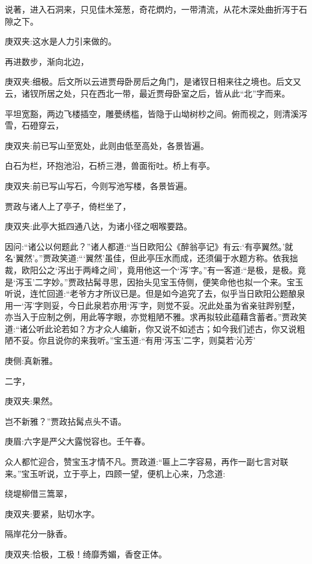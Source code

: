 \begin{parag}
    说著，进入石洞来，只见佳木笼葱，奇花熌灼，一带清流，从花木深处曲折泻于石隙之下。 \begin{note}庚双夹:这水是人力引来做的。\end{note} 再进数步，渐向北边， \begin{note}庚双夹:细极。后文所以云进贾母卧房后之角门，是诸钗日相来往之境也。后文又云，诸钗所居之处，只在西北一带，最近贾母卧室之后，皆从此“北”字而来。\end{note} 平坦宽豁，两边飞楼插空，雕甍绣槛，皆隐于山坳树杪之间。俯而视之，则清溪泻雪，石磴穿云， \begin{note}庚双夹:前已写山至宽处，此则由低至高处，各景皆遍。\end{note} 白石为栏，环抱池沿，石桥三港，兽面衔吐。桥上有亭。 \begin{note}庚双夹:前已写山写石，今则写池写楼，各景皆遍。\end{note} 贾政与诸人上了亭子，倚栏坐了， \begin{note}庚双夹:此亭大抵四通八达，为诸小径之咽喉要路。\end{note} 因问:“诸公以何题此？”诸人都道:“当日欧阳公《醉翁亭记》有云:‘有亭翼然。’就名‘翼然’。”贾政笑道:“‘翼然’虽佳，但此亭压水而成，还须偏于水题方称。依我拙裁，欧阳公之‘泻出于两峰之间’，竟用他这一个‘泻’字。”有一客道:“是极，是极。竟是‘泻玉’二字妙。”贾政拈髯寻思，因抬头见宝玉侍侧，便笑命他也拟一个来。宝玉听说，连忙回道:“老爷方才所议已是。但是如今追究了去，似乎当日欧阳公题酿泉用一‘泻’字则妥，今日此泉若亦用‘泻’字，则觉不妥。况此处虽为省亲驻跸别墅，亦当入于应制之例，用此等字眼，亦觉粗陋不雅。求再拟较此蕴藉含蓄者。”贾政笑道:“诸公听此论若如？方才众人编新，你又说不如述古；如今我们述古，你又说粗陋不妥。你且说你的来我听。”宝玉道:“有用‘泻玉’二字，则莫若‘沁芳’ \begin{note}庚侧:真新雅。\end{note} 二字， \begin{note}庚双夹:果然。\end{note} 岂不新雅？”贾政拈髯点头不语。 \begin{note}庚眉:六字是严父大露悦容也。壬午春。\end{note} 众人都忙迎合，赞宝玉才情不凡。贾政道:“匾上二字容易，再作一副七言对联来。”宝玉听说，立于亭上，四顾一望，便机上心来，乃念道:
\end{parag}


\begin{poem}
    \begin{pl}绕堤柳借三篙翠，\end{pl}
    \begin{note}庚双夹:要紧，贴切水字。\end{note}

    \begin{pl}隔岸花分一脉香。\end{pl}
    \begin{note}庚双夹:恰极，工极！绮靡秀媚，香奁正体。\end{note}
\end{poem}


